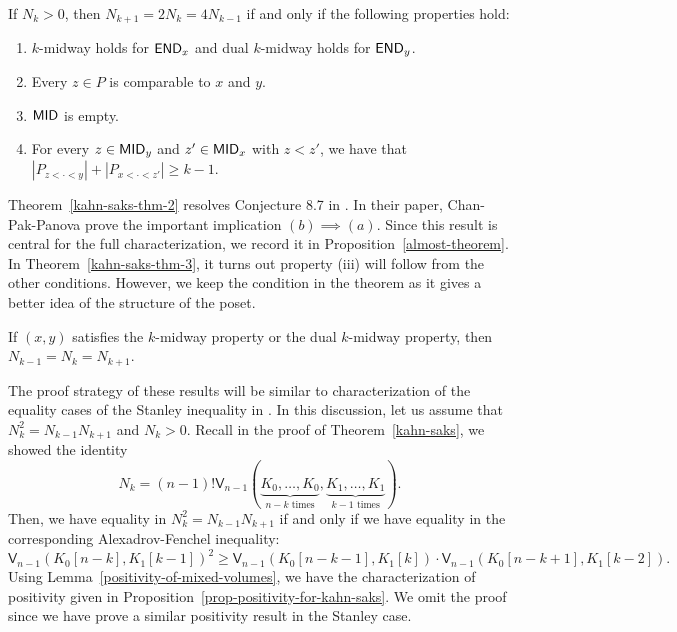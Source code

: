 \documentclass{puthesis-UG}
\begin{document}
\begin{thm} \label{kahn-saks-thm-3}
	If $N_k > 0$, then $N_{k+1} = 2N_k = 4N_{k-1}$ if and only if the following properties hold: 
	\begin{enumerate}[label = (\roman*)]
		\item $k$-midway holds for $\mathsf{END}_x$ and dual $k$-midway holds for $\mathsf{END}_y$.  
		\item Every $z \in P$ is comparable to $x$ and $y$. 
		\item $\mathsf{MID}$ is empty. 
		\item For every $z \in \mathsf{MID}_y$ and $z' \in \mathsf{MID}_x$ with $z < z'$, we have that $|P_{z < \cdot < y}| + |P_{x < \cdot < z'}| \geq k-1$. 
	\end{enumerate}
\end{thm}

\begin{remark}
	Theorem~\ref{kahn-saks-thm-2} resolves Conjecture 8.7 in \cite{chan2022extensions}. In their paper, Chan-Pak-Panova prove the important implication $(b) \implies (a)$. Since this result is central for the full characterization, we record it in Proposition~\ref{almost-theorem}. In Theorem~\ref{kahn-saks-thm-3}, it turns out property (iii) will follow from the other conditions. However, we keep the condition in the theorem as it gives a better idea of the structure of the poset. 
\end{remark}

\begin{prop} \label{almost-theorem}
	If $(x, y)$ satisfies the $k$-midway property or the dual $k$-midway property, then $N_{k-1} = N_k = N_{k+1}$. 
\end{prop}

The proof strategy of these results will be similar to characterization of the equality cases of the Stanley inequality in \cite{shenfeld2022extremals}. In this discussion, let us assume that $N_k^2 = N_{k-1} N_{k+1}$ and $N_k > 0$. Recall in the proof of Theorem~\ref{kahn-saks}, we showed the identity 
\[
	N_k = (n-1)! \mathsf{V}_{n-1} \left ( \underbrace{K_0, \ldots, K_0}_{n-k \text{ times}}, \underbrace{K_1, \ldots, K_1}_{k-1 \text{ times}} \right ).
\]
Then, we have equality in $N_k^2 = N_{k-1} N_{k+1}$ if and only if we have equality in the corresponding Alexadrov-Fenchel inequality:
\[
	\mathsf{V}_{n-1}(K_0[n-k], K_1[k-1])^2 \geq \mathsf{V}_{n-1} (K_0[n-k-1], K_1[k]) \cdot \mathsf{V}_{n-1} (K_0[n-k+1], K_1[k-2]).
\]
Using Lemma~\ref{positivity-of-mixed-volumes}, we have the characterization of positivity given in Proposition~\ref{prop-positivity-for-kahn-saks}. We omit the proof since we have prove a similar positivity result in the Stanley case. 
\end{document}
